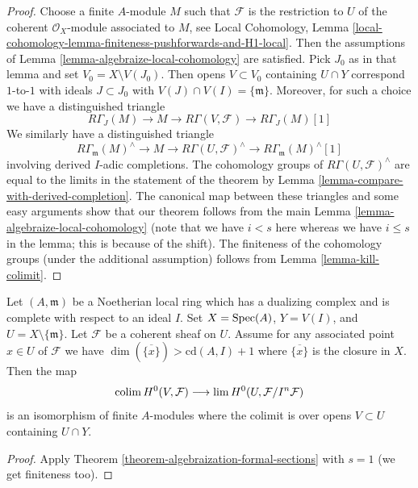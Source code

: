 \begin{proof}
Choose a finite $A$-module $M$ such that $\mathcal{F}$ is the
restriction to $U$ of the
coherent $\mathcal{O}_X$-module associated to $M$, see Local Cohomology,
Lemma \ref{local-cohomology-lemma-finiteness-pushforwards-and-H1-local}.
Then the assumptions of
Lemma \ref{lemma-algebraize-local-cohomology}
are satisfied.
Pick $J_0$ as in that lemma and set $V_0 = X \setminus V(J_0)$.
Then opens $V \subset V_0$ containing $U \cap Y$
correspond $1$-to-$1$ with ideals $J \subset J_0$ with
$V(J) \cap V(I) = \{\mathfrak m\}$.
Moreover, for such a choice we have a distinguished triangle
$$
R\Gamma_J(M) \to M \to R\Gamma(V, \mathcal{F}) \to
R\Gamma_J(M)[1]
$$
We similarly have a distinguished triangle
$$
R\Gamma_\mathfrak m(M)^\wedge \to
M \to
R\Gamma(U, \mathcal{F})^\wedge \to
R\Gamma_\mathfrak m(M)^\wedge[1]
$$
involving derived $I$-adic completions.
The cohomology groups of $R\Gamma(U, \mathcal{F})^\wedge$ are
equal to the limits in the statement of the theorem by
Lemma \ref{lemma-compare-with-derived-completion}.
The canonical map between these triangles
and some easy arguments show that our
theorem follows from the main Lemma \ref{lemma-algebraize-local-cohomology}
(note that we have $i < s$ here whereas we have
$i \leq s$ in the lemma; this is because of the shift).
The finiteness of the cohomology groups
(under the additional assumption) follows from
Lemma \ref{lemma-kill-colimit}.
\end{proof}

\begin{lemma}
\label{lemma-application-theorem}
Let $(A, \mathfrak m)$ be a Noetherian local ring which has a
dualizing complex and is complete with respect to an ideal $I$.
Set $X = \mathop{\mathrm{Spec}}(A)$, $Y = V(I)$, and $U = X \setminus \{\mathfrak m\}$.
Let $\mathcal{F}$ be a coherent sheaf on $U$.
Assume for any associated point $x \in U$ of $\mathcal{F}$
we have $\dim(\overline{\{x\}}) > \text{cd}(A, I) + 1$
where $\overline{\{x\}}$ is the closure in $X$.
Then the map
$$
\mathop{\mathrm{colim}}\nolimits H^0(V, \mathcal{F})
\longrightarrow
\mathop{\mathrm{lim}}\nolimits H^0(U, \mathcal{F}/I^n\mathcal{F})
$$
is an isomorphism of finite $A$-modules
where the colimit is over opens $V \subset U$
containing $U \cap Y$.
\end{lemma}

\begin{proof}
Apply Theorem \ref{theorem-algebraization-formal-sections} with $s = 1$
(we get finiteness too).
\end{proof}




